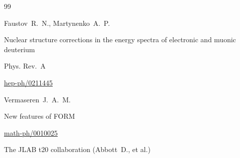 \begin{thebibliography}{99}




















\by Faustov~R.~N., Martynenko~A.~P.

\paper Nuclear structure corrections in the energy spectra of electronic and muonic deuterium

\jour Phys. Rev.~A






\arxiv \href{http://arxiv.org/abs/hep-ph/0211445}{hep-ph/0211445}




\by Vermaseren~J.~A.~M.

\preprint New features of FORM

\arxiv \href{http://arxiv.org/abs/math-ph/0010025}{math-ph/0010025}






\by The JLAB t20 collaboration (Abbott~D., et al.)


\end{thebibliography}
